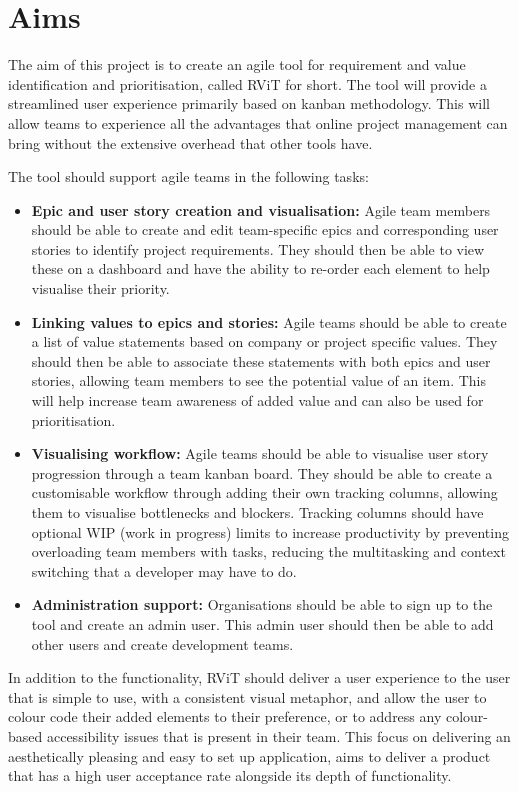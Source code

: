 \documentclass[l4proj.tex]{subfiles}
\begin{document}
\section{Aims}
The aim of this project is to create an agile tool for requirement and value identification and prioritisation, called RViT for short. The tool will provide a streamlined user experience primarily based on kanban methodology. This will allow teams to experience all the advantages that online project management can bring without the extensive overhead that other tools have.

The tool should support agile teams in the following tasks: 
\begin{itemize}
    \item \textbf{Epic and user story creation and visualisation:}
    Agile team members should be able to create and edit team-specific epics and corresponding user stories to identify project requirements. They should then be able to view these on a dashboard and have the ability to re-order each element to help visualise their priority.
    \item \textbf{Linking values to epics and stories:}
    Agile teams should be able to create a list of value statements based on company or project specific values. They should then be able to associate these statements with both epics and user stories, allowing team members to see the potential value of an item. This will help increase team awareness of added value and can also be used for prioritisation.
    \item \textbf{Visualising workflow:}
    Agile teams should be able to visualise user story progression through a team kanban board. They should be able to create a customisable workflow through adding their own tracking columns, allowing them to visualise bottlenecks and blockers. Tracking columns should have optional WIP (work in progress) limits to increase productivity by preventing overloading team members with tasks, reducing the multitasking and context switching that a developer may have to do. 
    \item \textbf{Administration support:}
    Organisations should be able to sign up to the tool and create an admin user. This admin user should then be able to add other users and create development teams.
\end{itemize}

In addition to the functionality, RViT should deliver a user experience to the user that is simple to use, with a consistent visual metaphor, and allow the user to colour code their added elements to their preference, or to address any colour-based accessibility issues that is present in their team. This focus on delivering an aesthetically pleasing and easy to set up application, aims to deliver a product that has a high user acceptance rate alongside its depth of functionality.
\end{document}
